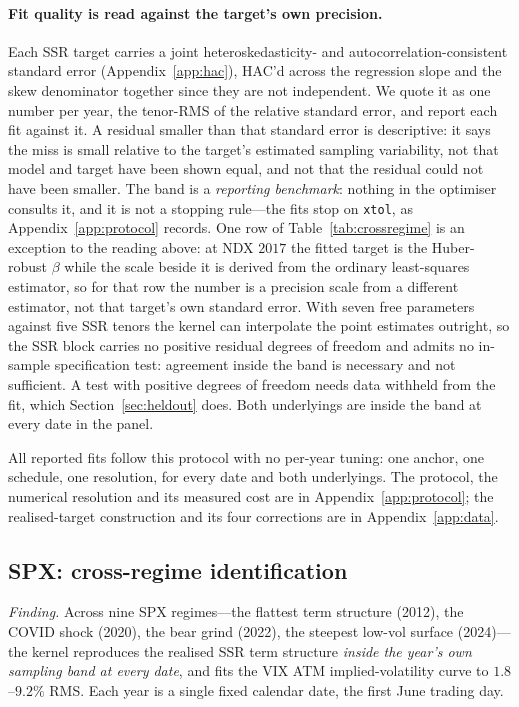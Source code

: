 \documentclass[11pt]{article}
\providecommand{\1}{\mathbf 1}
\begin{document}
\paragraph{Fit quality is read against the target's own precision.} Each SSR target carries a joint
heteroskedasticity- and autocorrelation-consistent standard error (Appendix~\ref{app:hac}), HAC'd
across the regression slope and the skew denominator together since they are not independent. We
quote it as one number per year, the tenor-RMS of the relative standard error, and report each fit
against it. A residual smaller than that standard error is descriptive: it says the miss is small
relative to the target's estimated sampling variability, not that model and target have been shown
equal, and not that the residual could not have been smaller. The band is a \emph{reporting
benchmark}: nothing in the optimiser consults it, and it is not a stopping rule---the fits stop on
\texttt{xtol}, as Appendix~\ref{app:protocol} records. One row of Table~\ref{tab:crossregime} is an
exception to the reading above: at NDX $2017$ the fitted target is the Huber-robust $\beta$ while the
scale beside it is derived from the ordinary least-squares estimator, so for that row the number is a
precision scale from a different estimator, not that target's own standard error. With seven free parameters against five SSR tenors the kernel
can interpolate the point estimates outright, so the SSR block carries no positive residual degrees
of freedom and admits no in-sample specification test: agreement inside the band is necessary and
not sufficient. A test with positive degrees of freedom needs data withheld from the fit, which
Section~\ref{sec:heldout} does. Both underlyings are inside the band at every date in the panel.

All reported fits follow this protocol with no per-year tuning: one anchor, one schedule, one
resolution, for every date and both underlyings. The protocol, the numerical resolution and its
measured cost are in Appendix~\ref{app:protocol}; the realised-target construction and its four
corrections are in Appendix~\ref{app:data}.

\subsection{SPX: cross-regime identification}
\label{sec:spx}

\emph{Finding.} Across nine SPX regimes---the flattest term structure (2012), the COVID shock (2020),
the bear grind (2022), the steepest low-vol surface (2024)---the kernel reproduces the realised SSR
term structure \emph{inside the year's own sampling band at every date}, and fits the VIX ATM
implied-volatility curve to $1.8$--$9.2\%$ RMS. Each year is a single fixed calendar date, the first
June trading day.
\end{document}

